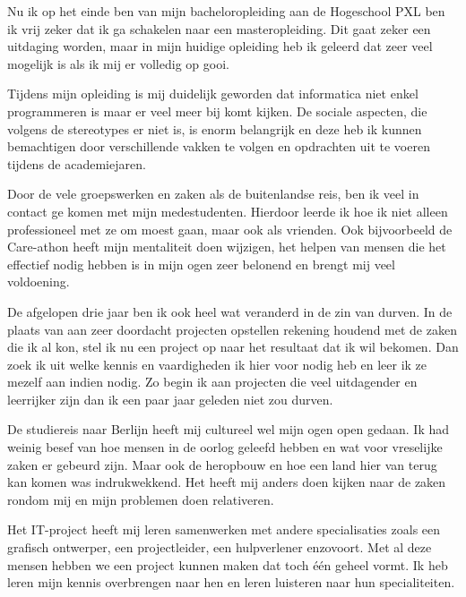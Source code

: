 
Nu ik op het einde ben van mijn bacheloropleiding aan de Hogeschool PXL ben ik vrij zeker dat ik ga schakelen naar een masteropleiding. Dit gaat zeker een uitdaging worden, maar in mijn huidige opleiding heb ik geleerd dat zeer veel mogelijk is als ik mij er volledig op gooi.

Tijdens mijn opleiding is mij duidelijk geworden dat informatica niet enkel programmeren is maar er veel meer bij komt kijken. De sociale aspecten, die volgens de stereotypes er niet is, is enorm belangrijk en deze heb ik kunnen bemachtigen door verschillende vakken te volgen en opdrachten uit te voeren tijdens de academiejaren.

Door de vele groepswerken en zaken als de buitenlandse reis, ben ik veel in contact ge komen met mijn medestudenten. Hierdoor leerde ik hoe ik niet alleen professioneel met ze om moest gaan, maar ook als vrienden. Ook bijvoorbeeld de Care\hyp{}athon heeft mijn mentaliteit doen wijzigen, het helpen van mensen die het effectief nodig hebben is in mijn ogen zeer belonend en brengt mij veel voldoening.

De afgelopen drie jaar ben ik ook heel wat veranderd in de zin van durven. In de plaats van aan zeer doordacht projecten opstellen rekening houdend met de zaken die ik al kon, stel ik nu een project op naar het resultaat dat ik wil bekomen. Dan zoek ik uit welke kennis en vaardigheden ik hier voor nodig heb en leer ik ze mezelf aan indien nodig. Zo begin ik aan projecten die veel uitdagender en leerrijker zijn dan ik een paar jaar geleden niet zou durven.

De studiereis naar Berlijn heeft mij cultureel wel mijn ogen open gedaan. Ik had weinig besef van hoe mensen in de oorlog geleefd hebben en wat voor vreselijke zaken er gebeurd zijn. Maar ook de heropbouw en hoe een land hier van terug kan komen was indrukwekkend. Het heeft mij anders doen kijken naar de zaken rondom mij en mijn problemen doen relativeren.

Het IT\hyp{}project heeft mij leren samenwerken met andere specialisaties zoals een grafisch ontwerper, een projectleider, een hulpverlener enzovoort. Met al deze mensen hebben we een project kunnen maken dat toch één geheel vormt. Ik heb leren mijn kennis overbrengen naar hen en leren luisteren naar hun specialiteiten.

